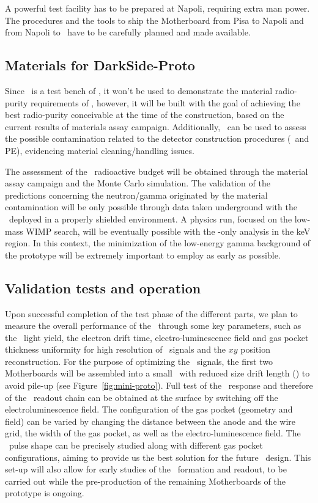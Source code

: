 A powerful test facility has to be prepared at Napoli, requiring extra man power. The procedures and the tools to ship the Motherboard from Pisa to Napoli and from Napoli to \CERN\ have to be carefully planned and made available. 


\subsection{Materials for DarkSide-Proto}

Since \DSps\ is a test bench of \DSks, it won't be used to demonstrate the material radio-purity requirements of \DSks, however, it will be built with the goal of achieving the best radio-purity conceivable at the time of the construction, based on the current results of materials assay campaign. Additionally, \DSps\ can be used to assess the possible contamination related to the detector construction procedures (\TPC\ and PE), evidencing material cleaning/handling issues.

The assessment of the \DSps\ radioactive budget will be obtained through the material assay campaign and the Monte Carlo simulation. The validation of the predictions concerning the neutron/gamma originated by the material contamination will be only possible through data taken underground with the \DSps\ deployed in a properly shielded environment. A physics run, focused on the low-mass WIMP search, will be eventually possible with the \STwo-only analysis in the keV region. In this context, the minimization of the low-energy gamma background of the prototype will be extremely important to employ as early as possible.


\subsection{Validation tests and operation}

Upon successful completion of the test phase of the different parts, we plan to measure the overall performance of the \DSps\ through some key parameters, such as the \SOne\ light yield, the electron drift time, electro-luminescence field and gas pocket thickness uniformity for high resolution of \STwo\ signals and the $x y$ position reconstruction. For the purpose of optimizing the \STwo\ signals, the first two Motherboards will be assembled into a small \TPC\ with reduced size drift length (\DSpZeroDriftLength) to avoid pile-up (see Figure~\ref{fig:mini-proto}). Full test of the \SOne\ response and therefore of the \SiPM\ readout chain can be obtained at the surface by switching off the electroluminescence field. The configuration of the gas pocket (geometry and field) can be varied by changing the distance between the anode and the wire grid, the width of the gas pocket, as well as the electro-luminescence field. The \STwo\ pulse shape can be precisely studied along with different gas pocket configurations, aiming to provide us the best solution for the future \LArTPC\ design.  This set-up will also allow for early studies of the \STwo\ formation and readout, to be carried out while the pre-production of the remaining Motherboards of the prototype is ongoing. 

